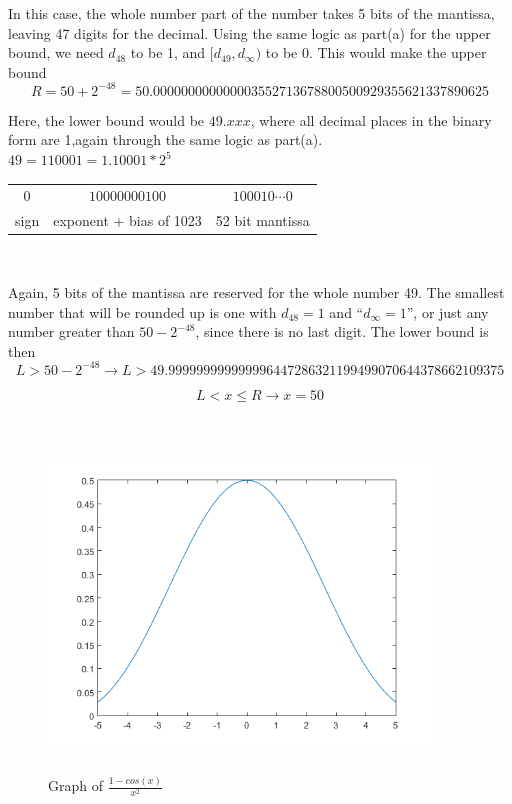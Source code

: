 	In this case, the whole number part of the number takes 5 bits of the mantissa, leaving 47 digits for the decimal. Using the same
	logic as part(a) for the upper bound, we need $d_{48}$ to be 1, and $[d_{49}, d_{\infty})$ to be 0. This would make the upper bound
		$$R = 50 + 2^{-48} = 50.000000000000003552713678800500929355621337890625$$

	Here, the lower bound would be $49.xxx$, where all decimal places in the binary form are 1,again through the same logic as part(a). \\

	$49 = 110001 = 1.10001*2^5$ \\

	\begin{center}
	\begin{tabular}{c | c | c}

		$0$ & $10000000100$ & $100010\cdots0$ \\

		sign & exponent + bias of 1023 & 52 bit mantissa \\

	\end{tabular} \\
	\end{center}

	Again, 5 bits of the mantissa are reserved for the whole number 49. The smallest number that will be rounded up is one with $d_{48}=1$
	and ``$d_{\infty}=1$'', or just any number greater than $50-2^{-48}$, since there is no last digit. The lower bound is then
	$$L > 50-2^{-48} \rightarrow L > 49.999999999999996447286321199499070644378662109375$$

	$$L < x \leq R \rightarrow x = 50$$ \\

\eenum

\item

	\begin{figure}[h!]
		\centering
		\includegraphics[width=4in, height=3.5in]{holmes1_12.png}
		\caption{Graph of $\frac{1-cos(x)}{x^2} $}
		\label{fig:graph333}
	\end{figure}

